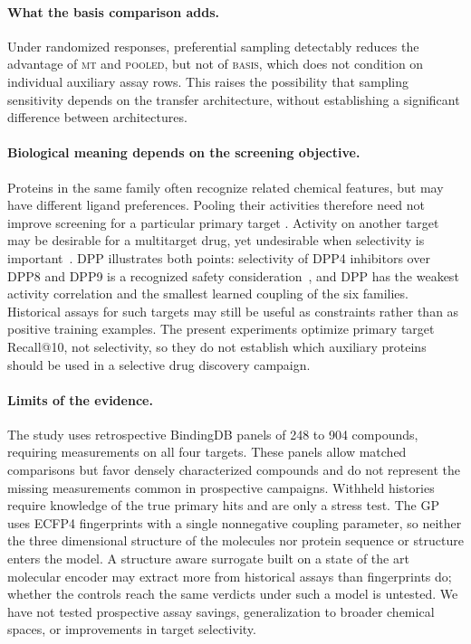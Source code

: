 \documentclass[10pt,letterpaper,runningheads]{llncs}
\newcommand{\mt}{\textsc{mt}}
\newcommand{\pooled}{\textsc{pooled}}
\newcommand{\basis}{\textsc{basis}}
\begin{document}
\paragraph{What the basis comparison adds.}
Under randomized responses, preferential sampling detectably reduces
the advantage of \mt{} and \pooled{}, but not of \basis{}, which does
not condition on individual auxiliary assay rows. This raises the
possibility that sampling sensitivity depends on the transfer
architecture, without establishing a significant difference between
architectures.

\paragraph{Biological meaning depends on the screening objective.}
Proteins in the same family often recognize related chemical features,
but may have different ligand preferences. Pooling their activities
therefore need not improve screening for a particular primary target
\cite{wang2019negative,xu2017demystifying}. Activity on another target
may be desirable for a multitarget drug, yet undesirable when
selectivity is important~\cite{paolini2006global,lankas2005dpp,vandenbroucke2014mmp}.
DPP illustrates both points: selectivity of DPP4 inhibitors over DPP8
and DPP9 is a recognized safety consideration~\cite{lankas2005dpp}, and
DPP has the weakest activity correlation and the smallest learned
coupling of the six families.
Historical assays for such targets may still be useful as constraints
rather than as positive training examples. The present experiments
optimize primary target Recall@10, not selectivity, so they do not
establish which auxiliary proteins should be used in a selective
drug discovery campaign.

\paragraph{Limits of the evidence.}
The study uses retrospective BindingDB panels of 248 to 904 compounds,
requiring measurements on all four targets. These panels allow matched
comparisons but favor densely characterized compounds and do not
represent the missing measurements common in prospective campaigns.
Withheld histories require knowledge
of the true primary hits and are only a stress test. The GP uses
ECFP4 fingerprints with a single nonnegative coupling parameter, so
neither the three dimensional structure of the molecules nor protein
sequence or structure enters the model. A structure aware surrogate
built on a state of the art molecular encoder may extract more from
historical assays than fingerprints do; whether the controls reach the
same verdicts under such a model is untested. We have not
tested prospective assay savings, generalization to broader chemical
spaces, or improvements in target selectivity.
\end{document}
